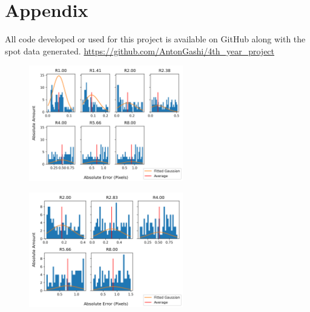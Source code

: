 \documentclass[aps,pra,a4paper,nofootinbib,onecolumn,tightenlines,longbibliography,12pt,amsfonts,amssymb,amsmath,floatfix]{revtex4-2} %
\begin{document}
\newpage
\appendix

\section{Appendix}
\label{sec:appendix}

  All code developed or used for this project is available on GitHub along with the spot data generated.
  \url{https://github.com/AntonGashi/4th_year_project}

  \begin{figure}[H]
    \begin{center}
      \includegraphics[width=0.6\textwidth]{project_pics/distro_centriod_5.png}
    \end{center}
    \caption{}
    \label{fig:box_5}
  \end{figure}

  \begin{figure}[H]
    \begin{center}
      \includegraphics[width=0.6\textwidth]{project_pics/noise_cen_scatter_5.png}
    \end{center}
    \caption{}
    \label{fig:box_5_noise}
  \end{figure}
\end{document}
